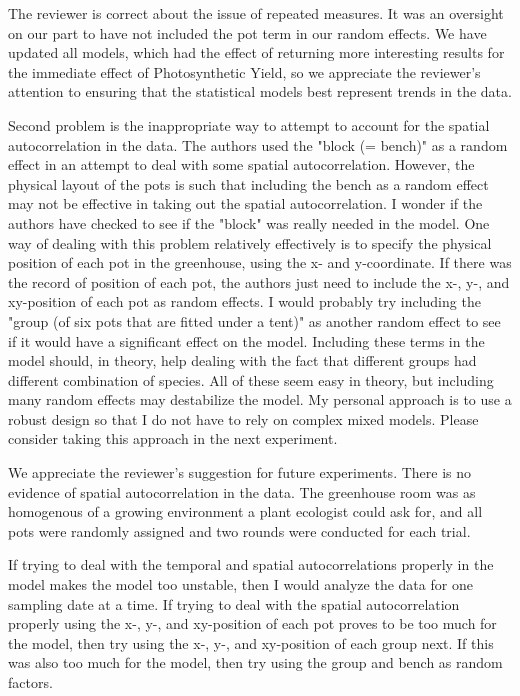 \documentclass[parskip=half]{scrartcl}
\newcommand{\AR}[1]
	{\color{PineGreen}#1\color{black} \par }
\begin{document}
\AR{The reviewer is correct about the issue of repeated measures. It was an oversight on our part to have not included the pot term in our random effects. We have updated all models, which had the effect of returning more interesting results for the immediate effect of Photosynthetic Yield, so we appreciate the reviewer's attention to ensuring that the statistical models best represent trends in the data.} 

Second problem is the inappropriate way to attempt to account for the spatial autocorrelation in the data. The authors used the "block (= bench)" as a random effect in an attempt to deal with some spatial autocorrelation. However, the physical layout of the pots is such that including the bench as a random effect may not be effective in taking out the spatial autocorrelation. I wonder if the authors have checked to see if the "block" was really needed in the model. One way of dealing with this problem relatively effectively is to specify the physical position of each pot in the greenhouse, using the x- and y-coordinate. If there was the record of position of each pot, the authors just need to include the x-, y-, and xy-position of each pot as random effects.
I would probably try including the "group (of six pots that are fitted under a tent)" as another random effect to see if it would have a significant effect on the model.
Including these terms in the model should, in theory, help dealing with the fact that different groups had different combination of species.
All of these seem easy in theory, but including many random effects may destabilize the model. My personal approach is to use a robust design so that I do not have to rely on complex mixed models. Please consider taking this approach in the next experiment.

\AR{We appreciate the reviewer's suggestion for future experiments. There is no evidence of spatial autocorrelation in the data. The greenhouse room was as homogenous of a growing environment a plant ecologist could ask for, and all pots were randomly assigned and two rounds were conducted for each trial.} 

If trying to deal with the temporal and spatial autocorrelations properly in the model makes the model too unstable, then I would analyze the data for one sampling date at a time.
If trying to deal with the spatial autocorrelation properly using the x-, y-, and xy-position of each pot proves to be too much for the model, then try using the x-, y-, and xy-position of each group next. If this was also too much for the model, then try using the group and bench as random factors.
\end{document}
